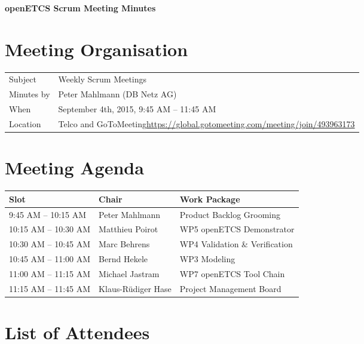 \documentclass[a4paper, 11pt]{article}
\begin{document}
{\begin{center}\huge\bf openETCS Scrum Meeting Minutes\end{center}}

\section{Meeting Organisation}

\renewcommand{\arraystretch}{1.5}
\begin{supertabular}{m{.2\textwidth}m{.8\textwidth}}
Subject & Weekly Scrum Meetings\\
Minutes by & Peter Mahlmann (DB Netz AG)\\
When & September 4th, 2015, 9:45 AM -- 11:45 AM\\
Location & Telco and GoToMeeting\newline \url{https://global.gotomeeting.com/meeting/join/493963173}\\
\end{supertabular}

\renewcommand{\arraystretch}{1.0}
\section{Meeting Agenda}

\begin{tabular}{lll}
\toprule
\textbf{Slot} &  \textbf{Chair} & \textbf{Work Package} \\
\midrule 
9:45 AM -- 10:15 AM & Peter Mahlmann & Product Backlog Grooming  \\
10:15 AM -- 10:30 AM & Matthieu Poirot & WP5 openETCS Demonstrator \\  
10:30 AM -- 10:45 AM & Marc Behrens & WP4 Validation \& Verification \\
10:45 AM -- 11:00 AM & Bernd Hekele & WP3 Modeling \\
11:00 AM -- 11:15 AM & Michael Jastram  & WP7 openETCS Tool Chain \\
11:15 AM -- 11:45 AM & Klaus-R\"udiger Hase & Project Management Board \\
\bottomrule
\end{tabular}

\section{List of Attendees}
\end{document}
